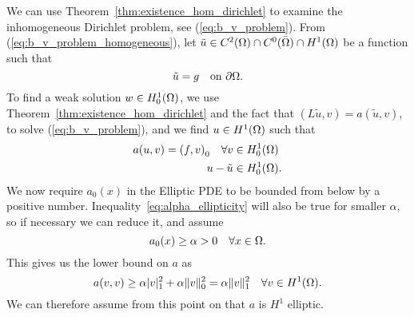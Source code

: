 We can use Theorem~\ref{thm:existence_hom_dirichlet} to examine the inhomogeneous Dirichlet problem, 
see (\ref{eq:b_v_problem}). From (\ref{eq:b_v_problem_homogeneous}), let 
$\tilde{u} \in C^2(\Omega)\cap C^0(\bar{\Omega}) \cap H^1(\Omega)$ be a function such that 
\begin{equation*}
   \tilde{u} = g \quad \text{on } \partial \Omega.
\end{equation*}
To find a weak solution $w \in H_0^1(\Omega)$, we use Theorem~\ref{thm:existence_hom_dirichlet} and the 
fact that $(L\tilde{u},v) = a(\tilde{u},v)$, to solve (\ref{eq:b_v_problem}), and
we find $u \in H^1(\Omega)$ such that 
\begin{align*}
   a(u,v) = {(f,v)}_0 \quad \forall v &\in H_0^1(\Omega) \\
   u-\tilde{u} & \in H_0^1(\Omega).
\end{align*}
We now require $a_0(x)$ in the Elliptic PDE to be bounded from below by a positive number. 
Inequality~\eqref{eq:alpha_ellipticity} will also be true for smaller $\alpha$, so if 
necessary we can reduce it, and assume 
\begin{equation*}
  a_0(x) \geq \alpha >0 \quad \forall x \in \Omega.
\end{equation*}
This gives us the lower bound on $a$ as 
\begin{equation*}
   a(v,v)  \geq \alpha |v|^2_1 + \alpha \|v\|^2_0 = \alpha \|v\|^2_1 \quad \forall v \in H^1(\Omega).
\end{equation*}
We can therefore assume from this point on that $a$ is $H^1$ elliptic.

